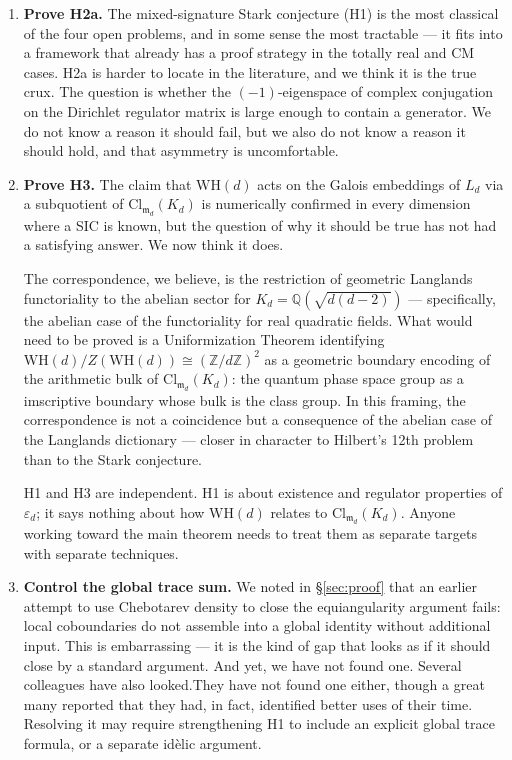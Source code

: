 \documentclass[12pt]{article}
\theoremstyle{plain}
\theoremstyle{definition}
\theoremstyle{remark}
\newcommand{\WH}{\mathrm{WH}}
\newcommand{\eps}{\varepsilon}
\newcommand{\bQ}{\mathbb{Q}}
\newcommand{\bZ}{\mathbb{Z}}
\begin{document}
\begin{enumerate}
  \item \textbf{Prove H2a.} The mixed-signature Stark conjecture (H1) is the most classical of the four open problems, and in some sense the most tractable — it fits into a framework that already has a proof strategy in the totally real and CM cases. H2a is harder to locate in the literature, and we think it is the true crux. The question is whether the $(-1)$-eigenspace of complex conjugation on the Dirichlet regulator matrix is large enough to contain a generator. We do not know a reason it should fail, but we also do not know a reason it should hold, and that asymmetry is uncomfortable.

  \item \textbf{Prove H3.} The claim that $\WH(d)$ acts on the Galois embeddings of $L_d$ via a subquotient of $\mathrm{Cl}_{\mathfrak{m}_d}(K_d)$ is numerically confirmed in every dimension where a SIC is known, but the question of why it should be true has not had a satisfying answer. We now think it does.

  The correspondence, we believe, is the restriction of geometric Langlands functoriality to the abelian sector for $K_d = \bQ(\sqrt{d(d-2)})$ — specifically, the abelian case of the functoriality for real quadratic fields. What would need to be proved is a Uniformization Theorem identifying $\WH(d)/Z(\WH(d)) \cong (\bZ/d\bZ)^2$ as a geometric boundary encoding of the arithmetic bulk of $\mathrm{Cl}_{\mathfrak{m}_d}(K_d)$: the quantum phase space group as a imscriptive boundary whose bulk is the class group. In this framing, the correspondence is not a coincidence but a consequence of the abelian case of the Langlands dictionary — closer in character to Hilbert's 12th problem than to the Stark conjecture.

  H1 and H3 are independent. H1 is about existence and regulator properties of $\eps_d$; it says nothing about how $\WH(d)$ relates to $\mathrm{Cl}_{\mathfrak{m}_d}(K_d)$. Anyone working toward the main theorem needs to treat them as separate targets with separate techniques.

  \item \textbf{Control the global trace sum.} We noted in §\ref{sec:proof} that an earlier attempt to use Chebotarev density to close the equiangularity argument fails: local coboundaries do not assemble into a global identity without additional input. This is embarrassing — it is the kind of gap that looks as if it should close by a standard argument. And yet, we have not found one. Several colleagues have also looked.They have not found one either, though a great many reported that they had, in fact, identified better uses of their time. Resolving it may require strengthening H1 to include an explicit global trace formula, or a separate id\`{e}lic argument.


\end{enumerate}
\end{document}
